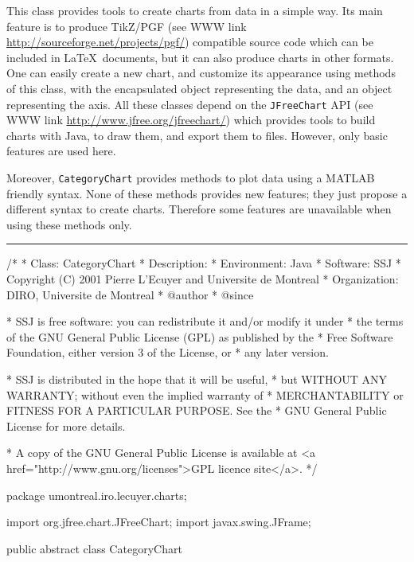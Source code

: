 
This class provides tools to create charts from data in a simple way. Its main
feature is to produce TikZ/PGF (see WWW link \url{http://sourceforge.net/projects/pgf/}) compatible source code which can be included
in \LaTeX\ documents, but it can also produce charts in other formats.
One can easily create a new chart, and customize its appearance using methods
of this class, with the encapsulated
 object
representing the data, and an 
object representing the axis.
All these classes depend on the \texttt{JFreeChart} API (see WWW link
\url{http://www.jfree.org/jfreechart/}) which provides tools to build charts with
Java, to draw them, and export them to files. However, only basic features are
used here.

Moreover, \texttt{CategoryChart} provides methods to plot data using a MATLAB friendly
syntax. None of these methods provides new features; they just propose a
different syntax to create charts. Therefore some features are unavailable
when using these methods only.

\bigskip\hrule
\begin{code}
\begin{hide}
/*
 * Class:        CategoryChart
 * Description:  
 * Environment:  Java
 * Software:     SSJ 
 * Copyright (C) 2001  Pierre L'Ecuyer and Universite de Montreal
 * Organization: DIRO, Universite de Montreal
 * @author       
 * @since

 * SSJ is free software: you can redistribute it and/or modify it under
 * the terms of the GNU General Public License (GPL) as published by the
 * Free Software Foundation, either version 3 of the License, or
 * any later version.

 * SSJ is distributed in the hope that it will be useful,
 * but WITHOUT ANY WARRANTY; without even the implied warranty of
 * MERCHANTABILITY or FITNESS FOR A PARTICULAR PURPOSE.  See the
 * GNU General Public License for more details.

 * A copy of the GNU General Public License is available at
   <a href="http://www.gnu.org/licenses">GPL licence site</a>.
 */
\end{hide}
package umontreal.iro.lecuyer.charts;\begin{hide}

import org.jfree.chart.JFreeChart;
import javax.swing.JFrame;\end{hide}

public abstract class CategoryChart \begin{hide} {

   protected Axis YAxis;
   protected SSJCategorySeriesCollection dataset;
   protected JFreeChart chart;
   protected boolean latexDocFlag = true;

   protected boolean autoRange;
   protected double[] manualRange;

   protected boolean grid = false;
   protected double ystepGrid;

   final protected double BOR = 0.1;\end{hide}
\end{code}

